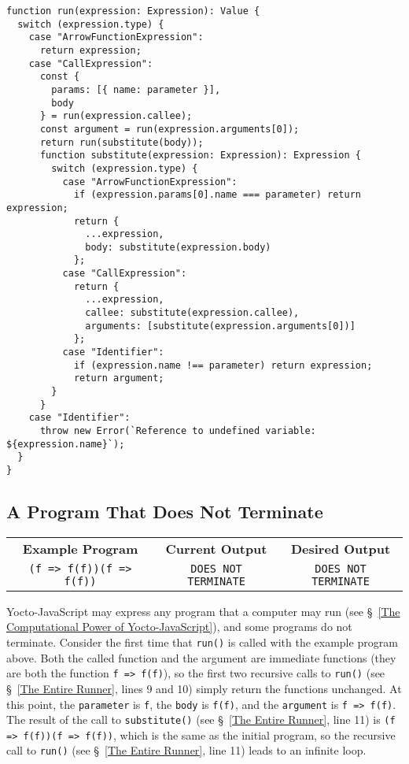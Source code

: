 \documentclass[12pt, oneside]{book}
\begin{document}
\begin{verbatim}
function run(expression: Expression): Value {
  switch (expression.type) {
    case "ArrowFunctionExpression":
      return expression;
    case "CallExpression":
      const {
        params: [{ name: parameter }],
        body
      } = run(expression.callee);
      const argument = run(expression.arguments[0]);
      return run(substitute(body));
      function substitute(expression: Expression): Expression {
        switch (expression.type) {
          case "ArrowFunctionExpression":
            if (expression.params[0].name === parameter) return expression;
            return {
              ...expression,
              body: substitute(expression.body)
            };
          case "CallExpression":
            return {
              ...expression,
              callee: substitute(expression.callee),
              arguments: [substitute(expression.arguments[0])]
            };
          case "Identifier":
            if (expression.name !== parameter) return expression;
            return argument;
        }
      }
    case "Identifier":
      throw new Error(`Reference to undefined variable: ${expression.name}`);
  }
}
\end{verbatim}

\subsection{A Program That Does Not Terminate}

\begin{center}
\begin{tabular}{c|c|c}
\textbf{Example Program} & \textbf{Current Output} & \textbf{Desired Output} \\
\texttt{(f => f(f))(f => f(f))} & \texttt{DOES NOT TERMINATE} & \texttt{DOES NOT TERMINATE} \\
\end{tabular}
\end{center}

\noindent Yocto-JavaScript may express any program that a computer may run (see §~\ref{The Computational Power of Yocto-JavaScript}), and some programs do not terminate. Consider the first time that \texttt{run()} is called with the example program above. Both the called function and the argument are immediate functions (they are both the function \texttt{f => f(f)}), so the first two recursive calls to \texttt{run()} (see §~\ref{The Entire Runner}, lines 9 and 10) simply return the functions unchanged. At this point, the \texttt{parameter} is \texttt{f}, the \texttt{body} is \texttt{f(f)}, and the \texttt{argument} is \texttt{f => f(f)}. The result of the call to \texttt{substitute()} (see §~\ref{The Entire Runner}, line 11) is \texttt{(f => f(f))(f => f(f))}, which is the same as the initial program, so the recursive call to \texttt{run()} (see §~\ref{The Entire Runner}, line 11) leads to an infinite loop.
\end{document}

